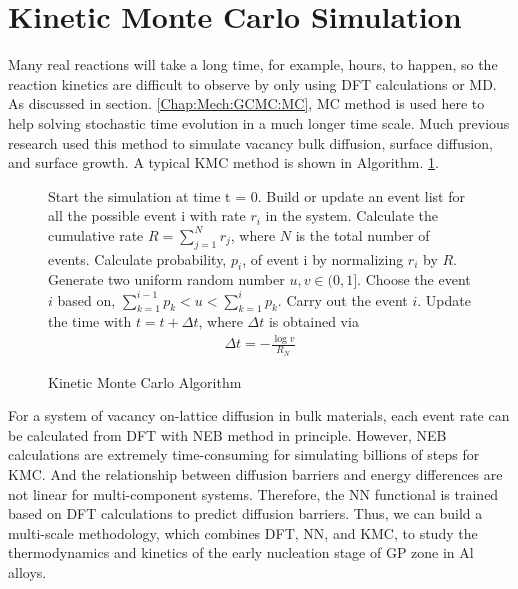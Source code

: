 \section{Kinetic Monte Carlo Simulation}
\label{chap:meth:KMC}

Many real reactions will take a long time, for example, hours, to happen, so the reaction kinetics are difficult to observe by only using \ac{DFT} calculations or \ac{MD}. As discussed in section. \ref{Chap:Mech:GCMC:MC}, \ac{MC} method is used here to help solving stochastic time evolution in a much longer time scale. Much previous research used this method to simulate vacancy bulk diffusion, surface diffusion, and surface growth. \cite{frenkel2001understanding, leach2001molecular} A typical \ac{KMC} method is shown in Algorithm. \ref{algo:kMC}.

\begin{figure}[htb]
\centering
\begin{minipage}{.7\linewidth}
\begin{algorithm}[H]
  \caption{Kinetic Monte Carlo Algorithm}\label{algo:kMC}
  \begin{algorithmic}[1]
    \State Start the simulation at time t = 0.
        \State Build or update an event list for all the possible event i with rate $r_i$ in the system.
        \State Calculate the cumulative rate $R = \sum_{j=1}^N r_j$,
            where $N$ is the total number of events. 
        \State Calculate probability, $p_i$, of event i by normalizing $r_i$ by $R$.
        \State Generate two uniform random number $u, v \in (0, 1]$.
        \State Choose the event $i$ based on,
               $\sum_{k=1}^{i-1} p_k < u < \sum_{k=1}^{i} p_k$.
        \State Carry out the event $i$.
        \State Update the time with $t = t + \Delta t$,
            where $\Delta t$ is obtained via
            \begin{align}
                \Delta t = - \frac{\log{v}}{R_N}
            \label{Chap:Meth:eq:KMC:1}
            \end{align}
    \EndWhile
\end{algorithmic}
\end{algorithm}
\end{minipage}
\end{figure}

For a system of vacancy on-lattice diffusion in bulk materials, each event rate can be calculated from \ac{DFT} with \ac{NEB} method in principle. However, \ac{NEB} calculations are extremely time-consuming for simulating billions of steps for \ac{KMC}. And the relationship between diffusion barriers and energy differences are not linear for multi-component systems. Therefore, the \ac{NN} functional is trained based on \ac{DFT} calculations to predict diffusion barriers. Thus, we can build a multi-scale methodology, which combines \ac{DFT}, \ac{NN}, and \ac{KMC}, to study the thermodynamics and kinetics of the early nucleation stage of GP zone in Al alloys.